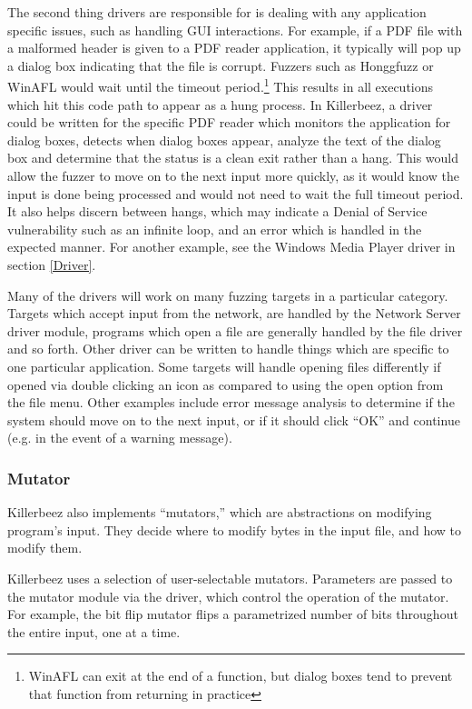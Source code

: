 \begin{multicols}{2}
The second thing drivers are responsible for is dealing with any application
specific issues, such as handling GUI interactions.  For example, if a PDF file
with a malformed header is given to a PDF reader application, it typically will
pop up a dialog box indicating that the file is corrupt. Fuzzers such as
Honggfuzz or WinAFL would wait until the timeout period.\footnote{WinAFL can
exit at the end of a function, but dialog boxes tend to prevent that function
from returning in practice} This results in all executions which hit this code
path to appear as a hung process.  In Killerbeez, a driver could be written for
the specific PDF reader which monitors the application for dialog boxes,
detects when dialog boxes appear, analyze the text of the dialog box and
determine that the status is a clean exit rather than a hang.  This would allow
the fuzzer to move on to the next input more quickly, as it would know the
input is done being processed and would not need to wait the full timeout
period.  It also helps discern between hangs, which may indicate a Denial of
Service vulnerability such as an infinite loop, and an error which is handled
in the expected manner. For another example, see the Windows Media Player
driver in section \ref{Driver}.

Many of the drivers will work on many fuzzing targets in a particular category.
Targets which accept input from the network, are handled by the Network Server
driver module, programs which open a file are generally handled by the file
driver and so forth.  Other driver can be written to handle things which are
specific to one particular application.  Some targets will handle opening files
differently if opened via double clicking an icon as compared to using the open
option from the file menu. Other examples include error message analysis to
determine if the system should move on to the next input, or if it should click
``OK'' and continue (e.g. in the event of a warning message).

\subsubsection{Mutator} \label{Mutator Overview}
Killerbeez also implements ``mutators,'' which are abstractions on modifying
program's input. They decide where to modify bytes in the input file, and how
to modify them.

Killerbeez uses a selection of user-selectable mutators. Parameters are passed
to the mutator module via the driver, which control the operation of the
mutator. For example, the bit flip mutator flips a parametrized number of bits
throughout the entire input, one at a time.


\end{multicols}
